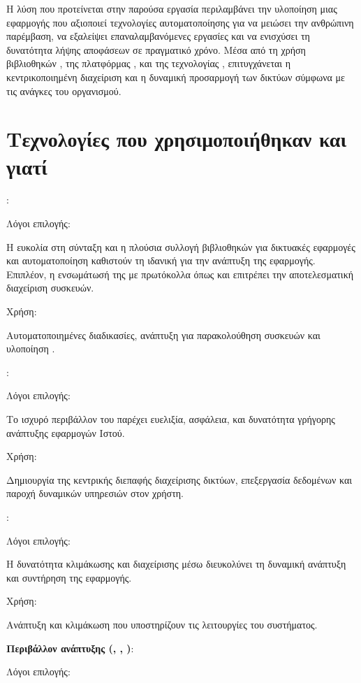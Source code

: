 Η λύση που προτείνεται στην παρούσα εργασία περιλαμβάνει την υλοποίηση μιας εφαρμογής που αξιοποιεί τεχνολογίες αυτοματοποίησης 
για να μειώσει την ανθρώπινη παρέμβαση, να εξαλείψει επαναλαμβανόμενες εργασίες και να ενισχύσει τη δυνατότητα λήψης αποφάσεων σε πραγματικό χρόνο. 
Μέσα από τη χρήση βιβλιοθηκών , της πλατφόρμας , και της τεχνολογίας , επιτυγχάνεται η κεντρικοποιημένη 
διαχείριση και η δυναμική προσαρμογή των δικτύων σύμφωνα με τις ανάγκες του οργανισμού.

\section{Τεχνολογίες που χρησιμοποιήθηκαν και γιατί}


\textbf{}:

Λόγοι επιλογής: 

Η ευκολία στη σύνταξη και η πλούσια συλλογή βιβλιοθηκών για δικτυακές εφαρμογές και αυτοματοποίηση καθιστούν τη  ιδανική για την ανάπτυξη της εφαρμογής. Επιπλέον, η ενσωμάτωσή της με πρωτόκολλα όπως  και  επιτρέπει την αποτελεσματική διαχείριση συσκευών.

Χρήση: 

Αυτοματοποιημένες διαδικασίες, ανάπτυξη  για παρακολούθηση συσκευών και υλοποίηση .

\textbf{}:

Λόγοι επιλογής: 

Το ισχυρό  περιβάλλον του  παρέχει ευελιξία, ασφάλεια, και δυνατότητα γρήγορης ανάπτυξης εφαρμογών Ιστού.

Χρήση: 

Δημιουργία της κεντρικής διεπαφής διαχείρισης δικτύων, επεξεργασία δεδομένων και παροχή δυναμικών υπηρεσιών στον χρήστη.

\textbf{}:

Λόγοι επιλογής: 

Η δυνατότητα κλιμάκωσης και διαχείρισης  μέσω  διευκολύνει τη δυναμική ανάπτυξη και συντήρηση της εφαρμογής.

Χρήση: 

Ανάπτυξη και κλιμάκωση  που υποστηρίζουν τις λειτουργίες του συστήματος.

\textbf{Περιβάλλον ανάπτυξης (, , )}:

Λόγοι επιλογής: 

